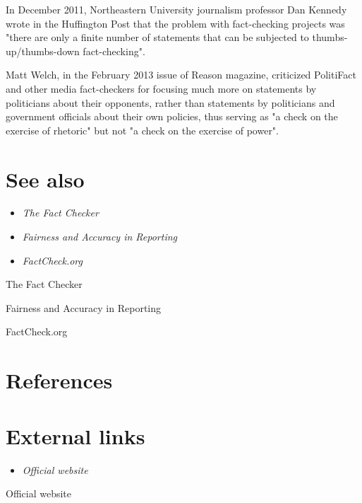 In December 2011, Northeastern University journalism professor Dan
Kennedy wrote in the Huffington Post that the problem with fact-checking
projects was "there are only a finite number of statements that can be
subjected to thumbs-up/thumbs-down fact-checking".

Matt Welch, in the February 2013 issue of Reason magazine, criticized
PolitiFact and other media fact-checkers for focusing much more on
statements by politicians about their opponents, rather than statements
by politicians and government officials about their own policies, thus
serving as "a check on the exercise of rhetoric" but not "a check on the
exercise of power".

\section{See also}\label{see-also}

\begin{itemize}
\item
  \emph{The Fact Checker}
\item
  \emph{Fairness and Accuracy in Reporting}
\item
  \emph{FactCheck.org}
\end{itemize}

The Fact Checker

Fairness and Accuracy in Reporting

FactCheck.org

\section{References}\label{references}

\section{External links}\label{external-links}

\begin{itemize}
\item
  \emph{Official website}
\end{itemize}

Official website
